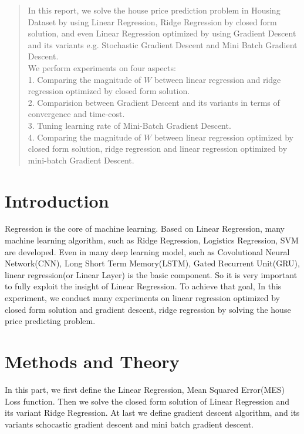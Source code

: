\documentclass[journal, a4paper]{IEEEtran}
\begin{document}
\begin{abstract}
In this report, we solve the house price prediction problem in Housing Dataset by using Linear Regression, Ridge Regression by closed form solution, and even Linear Regression optimized by using Gradient Descent and its variants e.g. Stochastic Gradient Descent and Mini Batch Gradient Descent. \\
We perform experiments on four aspects: \\
1. Comparing the magnitude of $W$ between linear regression and ridge regression optimized by closed form solution. \\
2. Comparision between Gradient Descent and its variants in terms of convergence and time-cost. \\
3. Tuning learning rate of Mini-Batch Gradient Descent. \\
4. Comparing the magnitude of $W$ between linear regression optimized by closed form solution, ridge regression and linear regression optimized by mini-batch Gradient Descent. \\
\end{abstract}

\section{Introduction}
 Regression is the core of machine learning. Based on Linear Regression, many machine learning algorithm, such as Ridge Regression, Logistics Regression, SVM are developed. Even in many deep learning model, such as Covolutional Neural Network(CNN), Long Short Term Memory(LSTM), Gated Recurrent Unit(GRU), linear regression(or Linear Layer) is the basic component. So it is very important to fully exploit the insight of Linear Regression. To achieve that goal, In this experiment, we conduct many experiments on linear regression optimized by closed form solution and gradient descent, ridge regression by solving the house price predicting problem.

\section{Methods and Theory}
In this part, we first define the Linear Regression, Mean Squared Error(MES) Loss function. Then we solve the closed form solution of Linear Regression and its variant Ridge Regression. At last we define gradient descent algorithm, and its variants schocastic gradient descent and mini batch gradient descent.
\end{document}
